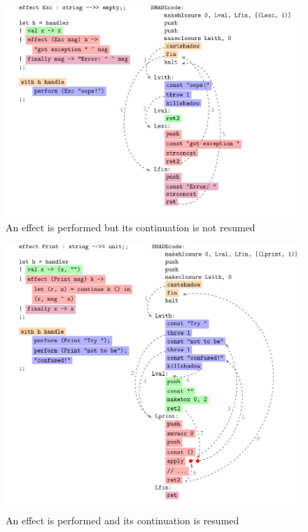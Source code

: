 \documentclass[class=article, crop=false]{standalone}
\begin{document}
\begin{figure}[htb]
    \centering
    \includegraphics[height=.45\textheight]{../figures/impl-exception.pdf}

    \caption{An effect is performed but its continuation is not resumed}
    \label{fig:shadecode-exception}
\end{figure}
%
\begin{figure}[htb]
    \centering
    \includegraphics[height=.45\textheight]{../figures/impl-one-resume.pdf}
    
    \caption{An effect is performed and its continuation is resumed}
    \label{fig:shadecode-one-resume}
\end{figure}
\end{document}
